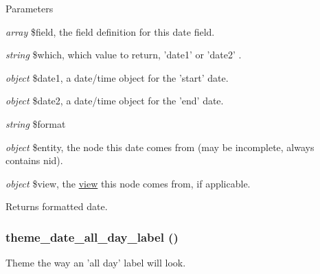 \begin{DoxyParams}{Parameters}
\item[{\em array}]\$field, the field definition for this date field. \item[{\em string}]\$which, which value to return, 'date1' or 'date2' . \item[{\em object}]\$date1, a date/time object for the 'start' date. \item[{\em object}]\$date2, a date/time object for the 'end' date. \item[{\em string}]\$format \item[{\em object}]\$entity, the node this date comes from (may be incomplete, always contains nid). \item[{\em object}]\$view, the \hyperlink{classview}{view} this node comes from, if applicable. \end{DoxyParams}
\begin{DoxyReturn}{Returns}
formatted date. 
\end{DoxyReturn}
\hypertarget{date__all__day_8module_a7f79e6f46a156f9901c910ac95be7382}{
\subsubsection[{theme\_\-date\_\-all\_\-day\_\-label}]{\setlength{\rightskip}{0pt plus 5cm}theme\_\-date\_\-all\_\-day\_\-label ()}}
\label{date__all__day_8module_a7f79e6f46a156f9901c910ac95be7382}
Theme the way an 'all day' label will look. 